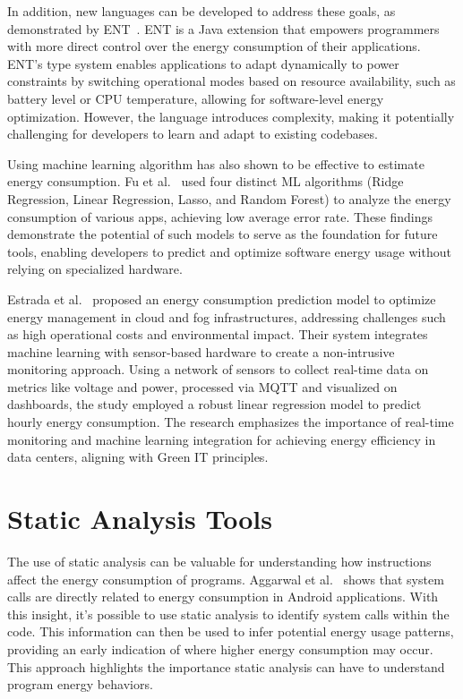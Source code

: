 In addition, new languages can be developed to address these goals, as demonstrated by ENT~\cite{10.1145/3062341.3062356}. ENT is a Java extension that empowers programmers with more direct control over the energy consumption of their applications. ENT’s type system enables applications to adapt dynamically to power constraints by switching operational modes based on resource availability, such as battery level or CPU temperature, allowing for software-level energy optimization. However, the language introduces complexity, making it potentially challenging for developers to learn and adapt to existing codebases. 

Using machine learning algorithm has also shown to be effective to estimate energy consumption. Fu et al.~\cite{8726531} used four distinct ML algorithms (Ridge Regression, Linear Regression, Lasso, and Random Forest) to analyze the energy consumption of various apps, achieving low average error rate. These findings demonstrate the potential of such models to serve as the foundation for future tools, enabling developers to predict and optimize software energy usage without relying on specialized hardware.

Estrada et al.~\cite{estrada2022learning} proposed an energy consumption prediction model to optimize energy management in cloud and fog infrastructures, addressing challenges such as high operational costs and environmental impact. Their system integrates machine learning with sensor-based hardware to create a non-intrusive monitoring approach. Using a network of sensors to collect real-time data on metrics like voltage and power, processed via MQTT and visualized on dashboards, the study employed a robust linear regression model to predict hourly energy consumption. The research emphasizes the importance of real-time monitoring and machine learning integration for achieving energy efficiency in data centers, aligning with Green IT principles.

\section{Static Analysis Tools}

The use of static analysis can be valuable for understanding how instructions affect the energy consumption of programs. Aggarwal et al.~\cite{aggarwal2014power} shows that system calls are directly related to energy consumption in Android applications. With this insight, it's possible to use static analysis to identify system calls within the code. This information can then be used to infer potential energy usage patterns, providing an early indication of where higher energy consumption may occur. This approach highlights the importance static analysis can have to understand program energy behaviors.

